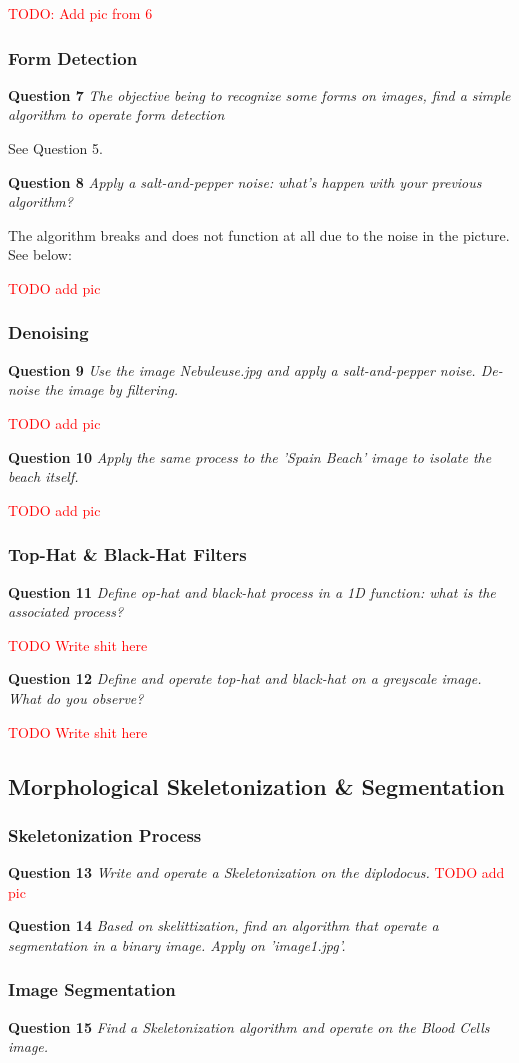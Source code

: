 \textcolor{red}{TODO: Add pic from 6}


\subsubsection{Form Detection}
\textbf{Question 7} \textit{The objective being to recognize some forms on images, ﬁnd a simple algorithm to operate form detection}

See Question 5.


\textbf{Question 8} \textit{Apply a salt-and-pepper noise: what’s happen with your previous algorithm?}

The algorithm breaks and does not function at all due to the noise in the picture. See below:

\textcolor{red}{TODO add pic}

\subsubsection{Denoising}
\textbf{Question 9} \textit{Use the image Nebuleuse.jpg and apply a salt-and-pepper noise. De-noise the image by ﬁltering.}

\textcolor{red}{TODO add pic}


\textbf{Question 10} \textit{Apply the same process to the ’Spain Beach’ image to isolate the beach itself.}

\textcolor{red}{TODO add pic}


\subsubsection{Top-Hat \& Black-Hat Filters}
\textbf{Question 11} \textit{Deﬁne op-hat and black-hat process in a 1D function: what is the associated process?}

\textcolor{red}{TODO Write shit here}


\textbf{Question 12} \textit{Deﬁne and operate top-hat and black-hat on a greyscale image. What do you observe?}

\textcolor{red}{TODO Write shit here}


\subsection{Morphological Skeletonization \& Segmentation}
\subsubsection{Skeletonization Process}
\textbf{Question 13} \textit{Write and operate a Skeletonization on the diplodocus.}
\textcolor{red}{TODO add pic}


\textbf{Question 14} \textit{Based on skelittization, ﬁnd an algorithm that operate a segmentation in a binary image. Apply on ’image1.jpg’.}


\subsubsection{Image Segmentation}
\textbf{Question 15} \textit{Find a Skeletonization algorithm and operate on the Blood Cells image.}


